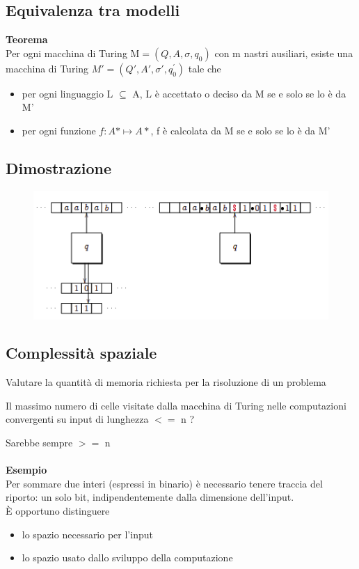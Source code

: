 \subsection{Equivalenza tra modelli}
\textbf{Teorema}\\
Per ogni macchina di Turing M$=(Q, A, \sigma, q_0)$ con m nastri ausiliari, esiste una macchina di Turing $M'=(Q', A', \sigma', q^{'}_0)$ tale che
\begin{itemize}
    \item per ogni linguaggio L $\subseteq$ A, L è accettato o deciso da M se e solo se lo è da M'
    \item per ogni funzione $f : A* \mapsto A*$, f è calcolata da M se e solo se lo è da M'
\end{itemize}
\newpage
\subsection{Dimostrazione}
\begin{figure}[htp]
    \centering
    \includegraphics[scale=0.6]{tesi_stile/img/foto3cap16.png}
\end{figure}
\subsection{Complessità spaziale}
Valutare la quantità di memoria richiesta per la risoluzione di un problema
\begin{center}
    Il massimo numero di celle visitate dalla macchina di Turing nelle computazioni convergenti su input di lunghezza $<=$ n ?
\end{center}
Sarebbe sempre $>=$ n\\\\
\textbf{Esempio}\\
Per sommare due interi (espressi in binario) è necessario tenere traccia del
riporto: un solo bit, indipendentemente dalla dimensione dell’input.
\\È opportuno distinguere
\begin{itemize}
    \item lo spazio necessario per l’input
    \item lo spazio usato dallo sviluppo della computazione
\end{itemize}
